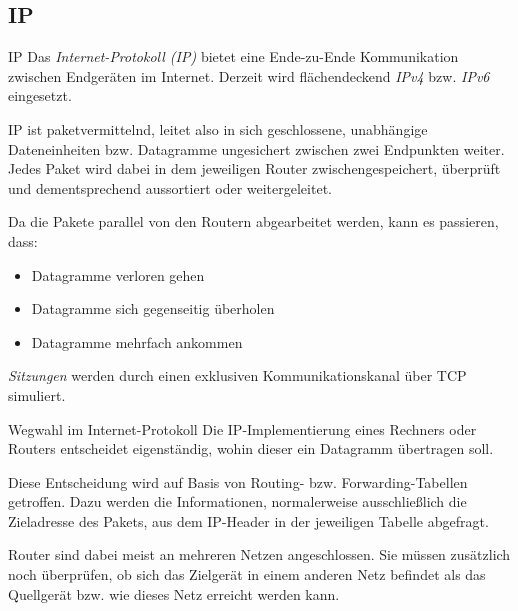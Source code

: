 \subsection{IP}

\begin{defi}{IP}
    Das \emph{Internet-Protokoll (IP)} bietet eine Ende-zu-Ende Kommunikation zwischen Endgeräten im Internet.
    Derzeit wird flächendeckend \emph{IPv4} bzw. \emph{IPv6} eingesetzt.
    
    IP ist paketvermittelnd, leitet also in sich geschlossene, unabhängige Dateneinheiten bzw. Datagramme ungesichert zwischen zwei Endpunkten weiter.
    Jedes Paket wird dabei in dem jeweiligen Router zwischengespeichert, überprüft und dementsprechend aussortiert oder weitergeleitet.
    
    Da die Pakete parallel von den Routern abgearbeitet werden, kann es passieren, dass:
    \begin{itemize}
        \item Datagramme verloren gehen
        \item Datagramme sich gegenseitig überholen
        \item Datagramme mehrfach ankommen
    \end{itemize}
    
    \emph{Sitzungen} werden durch einen exklusiven Kommunikationskanal über TCP simuliert.
\end{defi}

\begin{defi}{Wegwahl im Internet-Protokoll}
    Die IP-Implementierung eines Rechners oder Routers entscheidet eigenständig, wohin dieser ein Datagramm übertragen soll.
    
    Diese Entscheidung wird auf Basis von Routing- bzw. Forwarding-Tabellen getroffen.
    Dazu werden die Informationen, normalerweise ausschließlich die Zieladresse des Pakets, aus dem IP-Header in der jeweiligen Tabelle abgefragt.
    
    Router sind dabei meist an mehreren Netzen angeschlossen.
    Sie müssen zusätzlich noch überprüfen, ob sich das Zielgerät in einem anderen Netz befindet als das Quellgerät bzw. wie dieses Netz erreicht werden kann.
\end{defi}

